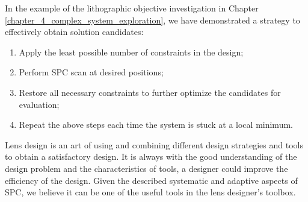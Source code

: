 In the example of the lithographic objective investigation in Chapter \ref{chapter_4_complex_system_exploration}, we have demonstrated a strategy to effectively obtain solution candidates:
\vspace{-\topsep}
\begin{enumerate}[noitemsep]
\item Apply the least possible number of constraints in the design;
\item Perform SPC scan at desired positions;
\item Restore all necessary constraints to further optimize the candidates for evaluation; 
\item Repeat the above steps each time the system is stuck at a local minimum.
\end{enumerate}
\vspace{-\topsep}

Lens design is an art of using and combining different design strategies and tools to obtain a satisfactory design. It is always with the good understanding of the design problem and the characteristics of tools, a designer could improve the efficiency of the design. Given the described systematic and adaptive aspects of SPC, we believe it can be one of the useful tools in the lens designer's toolbox.  

